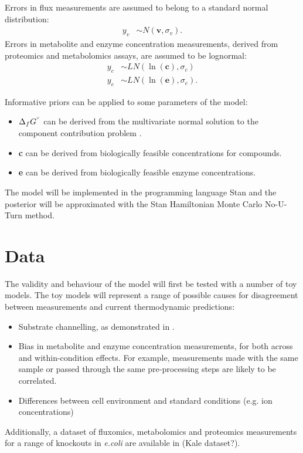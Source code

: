 \documentclass[11pt]{article}
\newcommand{\sdgf}{\Delta_fG^{\degree}}
\begin{document}
	Errors in flux measurements are assumed to belong to a standard normal distribution:
	\begin{align*}
		y_{v} &\sim N(\textbf{v}, \sigma_{v}).
	\end{align*}
	Errors in metabolite and enzyme concentration measurements, derived from proteomics and metabolomics assays, are
	assumed to be lognormal:
	\begin{align*}
		y_{c} & \sim LN(\ln(\textbf{c}), \sigma_{c}) \\
		y_{e} & \sim LN(\ln(\textbf{e}), \sigma_{e}).
	\end{align*}

	Informative priors can be applied to some parameters of the model:
	\begin{itemize}
		\item $\sdgf$ can be derived from the multivariate normal solution to the component contribution problem \cite{noor_2013_equilibrator}.
		\item \textbf{c} can be derived from biologically feasible concentrations for compounds.
		\item \textbf{e} can be derived from biologically feasible enzyme concentrations.
	\end{itemize}

	The model will be implemented in the programming language Stan \cite{stan} and the posterior will be approximated with
	the Stan Hamiltonian Monte Carlo No-U-Turn method.

	\section{Data}
	The validity and behaviour of the model will first be tested with a number of toy models.
	The toy models will represent a range of possible causes for disagreement between measurements and current
	thermodynamic predictions:
	\begin{itemize}
		\item Substrate channelling, as demonstrated in \cite{gollub_2021_prob_sampling}.
		\item Bias in metabolite and enzyme concentration measurements, for both across and within-condition effects. For
		example, measurements made with the same sample or passed through the same pre-processing steps are likely to
		be correlated.
		\item Differences between cell environment and standard conditions (e.g. ion concentrations)
	\end{itemize}
	Additionally, a dataset of fluxomics, metabolomics and proteomics measurements for a range of knockouts in \textit{e.coli}
	are available in \cite{kale} (Kale dataset?).
\end{document}
